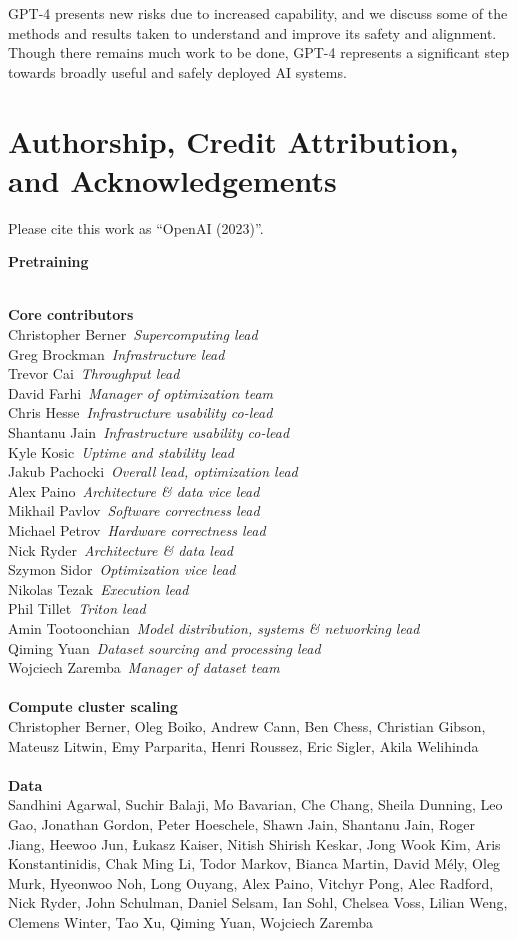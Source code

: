 \documentclass{article}
\newcommand{\creditsectionheader}[1]{\parbox{\columnwidth}{\centering \textbf{\small #1}}\\}
\newcommand{\creditlistheader}[1]{\textbf{#1}\footnotemark[\thefootnote]\\}
\newcommand{\creditlist}[2]{\creditlistheader{#1}#2\\
\\}
\newcommand{\corecontributor}[2]{#1\ \textit{#2}\\}
\begin{document}
GPT-4 presents new risks due to increased capability, and we discuss some of the methods and results taken to understand and improve its safety and alignment. Though there remains much work to be done, GPT-4 represents a significant step towards broadly useful and safely deployed AI systems.






\newpage
\section*{Authorship, Credit Attribution, and Acknowledgements}
Please cite this work as ``OpenAI (2023)''.
      
\begin{multicols}{2}
\scriptsize
{}
\creditsectionheader{Pretraining}
\creditlistheader{Core contributors}
\corecontributor{Christopher Berner}{Supercomputing lead}
\corecontributor{Greg Brockman}{Infrastructure lead}
\corecontributor{Trevor Cai}{Throughput lead}
\corecontributor{David Farhi}{Manager of optimization team}
\corecontributor{Chris Hesse}{Infrastructure usability co-lead}
\corecontributor{Shantanu Jain}{Infrastructure usability co-lead}
\corecontributor{Kyle Kosic}{Uptime and stability lead}
\corecontributor{Jakub Pachocki}{Overall lead, optimization lead}
\corecontributor{Alex Paino}{Architecture \& data vice lead}
\corecontributor{Mikhail Pavlov}{Software correctness lead}
\corecontributor{Michael Petrov}{Hardware correctness lead}
\corecontributor{Nick Ryder}{Architecture \& data lead}
\corecontributor{Szymon Sidor}{Optimization vice lead}
\corecontributor{Nikolas Tezak}{Execution lead}
\corecontributor{Phil Tillet}{Triton lead}
\corecontributor{Amin Tootoonchian}{Model distribution, systems \& networking lead}
\corecontributor{Qiming Yuan}{Dataset sourcing and processing lead}
\corecontributor{Wojciech Zaremba}{Manager of dataset team}
\\
\creditlist{Compute cluster scaling}{Christopher Berner, Oleg Boiko, Andrew Cann, Ben Chess, Christian Gibson, Mateusz Litwin, Emy Parparita, Henri Roussez, Eric Sigler, Akila Welihinda}
\creditlist{Data}{Sandhini Agarwal, Suchir Balaji, Mo Bavarian, Che Chang, Sheila Dunning, Leo Gao, Jonathan Gordon, Peter Hoeschele, Shawn Jain, Shantanu Jain, Roger Jiang, Heewoo Jun, Łukasz Kaiser, Nitish Shirish Keskar, Jong Wook Kim, Aris Konstantinidis, Chak Ming Li, Todor Markov, Bianca Martin, David Mély, Oleg Murk, Hyeonwoo Noh, Long Ouyang, Alex Paino, Vitchyr Pong, Alec Radford, Nick Ryder, John Schulman, Daniel Selsam, Ian Sohl, Chelsea Voss, Lilian Weng, Clemens Winter, Tao Xu, Qiming Yuan, Wojciech Zaremba}

\end{multicols}
\end{document}
